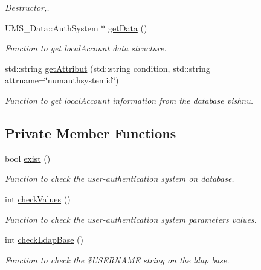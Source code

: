 \begin{DoxyCompactItemize}
\begin{DoxyCompactList}\small\item\em Destructor,. \item\end{DoxyCompactList}\item 
UMS\_\-Data::AuthSystem $\ast$ \hyperlink{classAuthSystemServer_a69750d507e1fd55809c56945296d16f2}{getData} ()
\begin{DoxyCompactList}\small\item\em Function to get localAccount data structure. \item\end{DoxyCompactList}\item 
std::string \hyperlink{classAuthSystemServer_aee74b548912425118acc08cab39aa6a6}{getAttribut} (std::string condition, std::string attrname=\char`\"{}numauthsystemid\char`\"{})
\begin{DoxyCompactList}\small\item\em Function to get localAccount information from the database vishnu. \item\end{DoxyCompactList}\end{DoxyCompactItemize}
\subsection*{Private Member Functions}
\begin{DoxyCompactItemize}
\item 
bool \hyperlink{classAuthSystemServer_a95abf6592fcf70e85e4f7c26ffb8868f}{exist} ()
\begin{DoxyCompactList}\small\item\em Function to check the user-\/authentication system on database. \item\end{DoxyCompactList}\item 
int \hyperlink{classAuthSystemServer_a88b32115acbc42f0dbe5c7d5c5c9bc0a}{checkValues} ()
\begin{DoxyCompactList}\small\item\em Function to check the user-\/authentication system parameters values. \item\end{DoxyCompactList}\item 
int \hyperlink{classAuthSystemServer_a84c79b51d53b26603fe1a0aea661ece5}{checkLdapBase} ()
\begin{DoxyCompactList}\small\item\em Function to check the \$USERNAME string on the ldap base. \item\end{DoxyCompactList}\end{DoxyCompactItemize}
